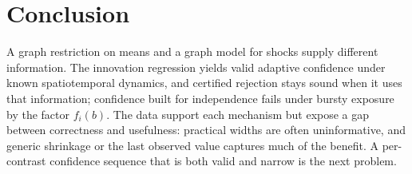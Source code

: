\documentclass[conference]{IEEEtran}
\begin{document}
\section{Conclusion}

A graph restriction on means and a graph model for shocks supply different information. The innovation regression yields valid adaptive confidence under known spatiotemporal dynamics, and certified rejection stays sound when it uses that information; confidence built for independence fails under bursty exposure by the factor $f_i(b)$. The data support each mechanism but expose a gap between correctness and usefulness: practical widths are often uninformative, and generic shrinkage or the last observed value captures much of the benefit. A per-contrast confidence sequence that is both valid and narrow is the next problem.



\end{document}
